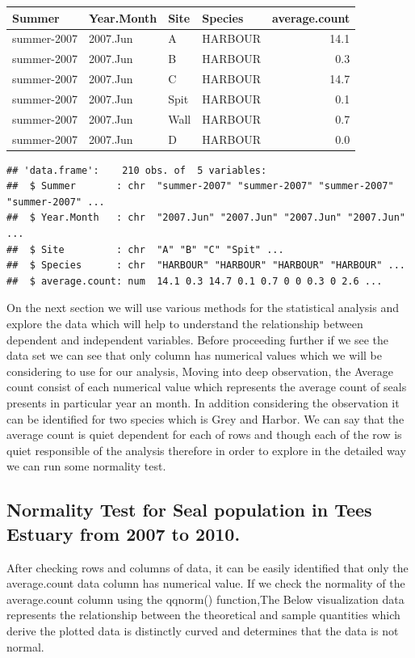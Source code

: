 \documentclass[
]{article}
\begin{document}
\begin{longtable}[]{@{}llllr@{}}
\toprule
Summer & Year.Month & Site & Species & average.count\tabularnewline
\midrule
\endhead
summer-2007 & 2007.Jun & A & HARBOUR & 14.1\tabularnewline
summer-2007 & 2007.Jun & B & HARBOUR & 0.3\tabularnewline
summer-2007 & 2007.Jun & C & HARBOUR & 14.7\tabularnewline
summer-2007 & 2007.Jun & Spit & HARBOUR & 0.1\tabularnewline
summer-2007 & 2007.Jun & Wall & HARBOUR & 0.7\tabularnewline
summer-2007 & 2007.Jun & D & HARBOUR & 0.0\tabularnewline
\bottomrule
\end{longtable}

\begin{verbatim}
## 'data.frame':    210 obs. of  5 variables:
##  $ Summer       : chr  "summer-2007" "summer-2007" "summer-2007" "summer-2007" ...
##  $ Year.Month   : chr  "2007.Jun" "2007.Jun" "2007.Jun" "2007.Jun" ...
##  $ Site         : chr  "A" "B" "C" "Spit" ...
##  $ Species      : chr  "HARBOUR" "HARBOUR" "HARBOUR" "HARBOUR" ...
##  $ average.count: num  14.1 0.3 14.7 0.1 0.7 0 0 0.3 0 2.6 ...
\end{verbatim}

On the next section we will use various methods for the statistical
analysis and explore the data which will help to understand the
relationship between dependent and independent variables. Before
proceeding further if we see the data set we can see that only column
has numerical values which we will be considering to use for our
analysis, Moving into deep observation, the Average count consist of
each numerical value which represents the average count of seals
presents in particular year an month. In addition considering the
observation it can be identified for two species which is Grey and
Harbor. We can say that the average count is quiet dependent for each of
rows and though each of the row is quiet responsible of the analysis
therefore in order to explore in the detailed way we can run some
normality test.

\hypertarget{normality-test-for-seal-population-in-tees-estuary-from-2007-to-2010.}{%
\subsection{Normality Test for Seal population in Tees Estuary from 2007
to
2010.}\label{normality-test-for-seal-population-in-tees-estuary-from-2007-to-2010.}}

After checking rows and columns of data, it can be easily identified
that only the average.count data column has numerical value. If we check
the normality of the average.count column using the qqnorm()
function,The Below visualization data represents the relationship
between the theoretical and sample quantities which derive the plotted
data is distinctly curved and determines that the data is not normal.
\end{document}
